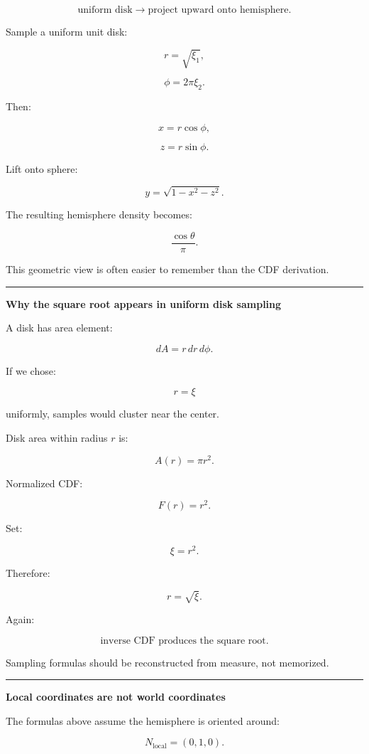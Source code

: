 \[
\text{uniform disk}
\rightarrow
\text{project upward onto hemisphere}.
\]

Sample a uniform unit disk:

\[
r=\sqrt{\xi_1},
\]

\[
\phi=2\pi\xi_2.
\]

Then:

\[
x=r\cos\phi,
\]

\[
z=r\sin\phi.
\]

Lift onto sphere:

\[
y=\sqrt{1-x^2-z^2}.
\]

The resulting hemisphere density becomes:

\[
\frac{\cos\theta}{\pi}.
\]

This geometric view is often easier to remember than the CDF derivation.

\begin{center}\rule{0.5\linewidth}{0.5pt}\end{center}

\textbf{Why the square root appears in uniform disk sampling}

A disk has area element:

\[
dA=r\,dr\,d\phi.
\]

If we chose:

\[
r=\xi
\]

uniformly, samples would cluster near the center.

Disk area within radius \(r\) is:

\[
A(r)=\pi r^2.
\]

Normalized CDF:

\[
F(r)=r^2.
\]

Set:

\[
\xi=r^2.
\]

Therefore:

\[
\boxed{
r=\sqrt{\xi}.
}
\]

Again:

\[
\boxed{
\text{inverse CDF produces the square root.}
}
\]

Sampling formulas should be reconstructed from measure, not memorized.

\begin{center}\rule{0.5\linewidth}{0.5pt}\end{center}

\textbf{Local coordinates are not world coordinates}

The formulas above assume the hemisphere is oriented around:

\[
N_{\text{local}}=(0,1,0).
\]

